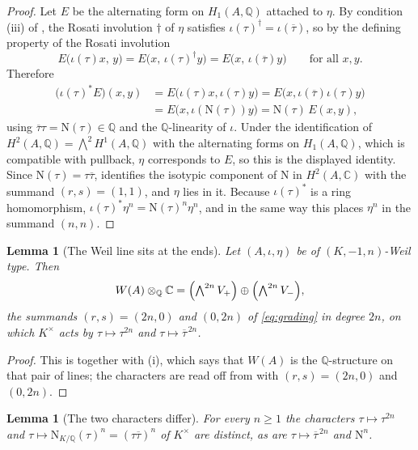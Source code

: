 \documentclass[11pt,reqno]{amsart}
\theoremstyle{plain}
\newtheorem{lemma}[theorem]{Lemma}
\theoremstyle{definition}
\theoremstyle{remark}
\newcommand{\QQ}{\mathbb{Q}}
\newcommand{\CC}{\mathbb{C}}
\newcommand{\HW}{W}                      %
\newcommand{\Nm}{\mathrm{N}}             %
\newcommand{\Kx}{K^{\times}}
\newcommand{\bbar}[1]{\overline{#1}}
\begin{document}
\begin{proof}
Let $E$ be the alternating form on $H_{1}(A,\QQ)$ attached to $\eta$. By
condition (iii) of , the Rosati involution $\dagger$ of
$\eta$ satisfies $\iota(\tau)^{\dagger}=\iota(\bbar{\tau})$, so by the
defining property of the Rosati involution
\[
  E\bigl(\iota(\tau)x,\,y\bigr)=E\bigl(x,\,\iota(\tau)^{\dagger}y\bigr)
  =E\bigl(x,\,\iota(\bbar{\tau})y\bigr)
  \qquad\text{for all }x,y .
\]
Therefore
\begin{align*}
  \bigl(\iota(\tau)^{*}E\bigr)(x,y)
  &=E\bigl(\iota(\tau)x,\iota(\tau)y\bigr)
   =E\bigl(x,\iota(\bbar{\tau})\iota(\tau)y\bigr)\\
  &=E\bigl(x,\iota(\Nm(\tau))y\bigr)=\Nm(\tau)\,E(x,y),
\end{align*}
using $\bbar{\tau}\tau=\Nm(\tau)\in\QQ$ and the $\QQ$-linearity of $\iota$.
Under the identification of $H^{2}(A,\QQ)=\bigwedge^{2}H^{1}(A,\QQ)$ with the
alternating forms on $H_{1}(A,\QQ)$, which is compatible with pullback, $\eta$
corresponds to $E$, so this is the displayed identity. Since
$\Nm(\tau)=\tau\bbar{\tau}$,  identifies the isotypic
component of $\Nm$ in $H^{2}(A,\CC)$ with the summand $(r,s)=(1,1)$, and
$\eta$ lies in it. Because $\iota(\tau)^{*}$ is a ring homomorphism,
$\iota(\tau)^{*}\eta^{n}=\Nm(\tau)^{n}\eta^{n}$, and in the same way this
places $\eta^{n}$ in the summand $(n,n)$.
\end{proof}

\begin{lemma}[The Weil line sits at the ends]\label{lem:weilchar}
Let $(A,\iota,\eta)$ be of $(K,-1,n)$-Weil type. Then
\[
  \HW(A)\otimes_{\QQ}\CC
  =\Bigl(\textstyle\bigwedge^{2n}V_{+}\Bigr)\oplus
   \Bigl(\textstyle\bigwedge^{2n}V_{-}\Bigr),
\]
the summands $(r,s)=(2n,0)$ and $(0,2n)$ of \eqref{eq:grading} in degree $2n$,
on which $\Kx$ acts by $\tau\mapsto\tau^{2n}$ and $\tau\mapsto\bbar{\tau}^{\,2n}$.
\end{lemma}

\begin{proof}
This is  together with (i), which says
that $\HW(A)$ is the $\QQ$-structure on that pair of lines; the characters are
read off from  with $(r,s)=(2n,0)$ and $(0,2n)$.
\end{proof}

\begin{lemma}[The two characters differ]\label{lem:charsdiffer}
For every $n\ge1$ the characters $\tau\mapsto\tau^{2n}$ and
$\tau\mapsto\Nm_{K/\QQ}(\tau)^{n}=(\tau\bbar{\tau})^{n}$ of $\Kx$ are distinct,
as are $\tau\mapsto\bbar{\tau}^{\,2n}$ and $\Nm^{n}$.
\end{lemma}
\end{document}
